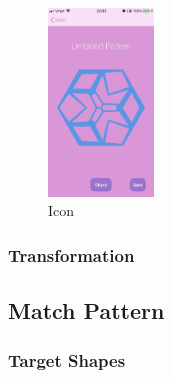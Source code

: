 \documentclass[11pt]{article}
\begin{document}
            \begin{figure}
                        \centering
                        \includegraphics[width=0.25\textwidth]{KiriZen/createUnfoldedPattern.png}
                        \caption{Icon}
                        \label{fig:kiriZen-createUnfoldedPattern}
                    \end{figure}

        \subsubsection{Transformation}
        
                \paragraph{}

    \subsection{Match Pattern}

    \subsubsection{Target Shapes}
    
\end{document}
